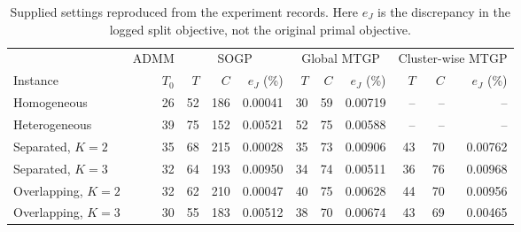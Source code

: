 \begin{table}[t]
\centering
\caption{Supplied settings reproduced from the experiment records. Here $e_J$ is the discrepancy in the logged split objective, not the original primal objective.}
\label{tab:supplied_results}
\footnotesize
\setlength{\tabcolsep}{5.1pt}
\renewcommand{\arraystretch}{1.12}
\begin{tabular}{l r rrr rrr rrr}
\toprule
& ADMM & \multicolumn{3}{c}{SOGP} & \multicolumn{3}{c}{Global MTGP} & \multicolumn{3}{c}{Cluster-wise MTGP}\\
\cmidrule(lr){2-2}\cmidrule(lr){3-5}\cmidrule(lr){6-8}\cmidrule(lr){9-11}
Instance & $T_0$ & $T$ & $C$ & $e_J$ (\%) & $T$ & $C$ & $e_J$ (\%) & $T$ & $C$ & $e_J$ (\%)\\
\midrule
Homogeneous & 26 & 52 & 186 & 0.00041 & 30 & 59 & 0.00719 & -- & -- & -- \\
Heterogeneous & 39 & 75 & 152 & 0.00521 & 52 & 75 & 0.00588 & -- & -- & -- \\
Separated, $K=2$ & 35 & 68 & 215 & 0.00028 & 35 & 73 & 0.00906 & 43 & 70 & 0.00762 \\
Separated, $K=3$ & 32 & 64 & 193 & 0.00950 & 34 & 74 & 0.00511 & 36 & 76 & 0.00968 \\
Overlapping, $K=2$ & 32 & 62 & 210 & 0.00047 & 40 & 75 & 0.00628 & 44 & 70 & 0.00956 \\
Overlapping, $K=3$ & 30 & 55 & 183 & 0.00512 & 38 & 70 & 0.00674 & 43 & 69 & 0.00465 \\
\bottomrule
\end{tabular}
\end{table}
